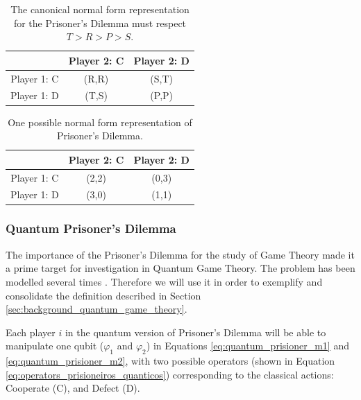 \begin{center}
\begin{table}
\begin{centering}
\begin{tabular}{ccc}
\hline 
 & Player 2: C & Player 2: D\tabularnewline
\hline 
Player 1: C & (R,R) & (S,T)\tabularnewline
Player 1: D & (T,S) & (P,P)\tabularnewline
\hline 
\end{tabular}
\par\end{centering}

\caption{The canonical normal form representation for the Prisoner's Dilemma must respect $T>R>P>S$.}
\label{tab:prisionersdillema_tab1}
\end{table}
\par\end{center}

\begin{center}
\begin{table}
\begin{centering}
\begin{tabular}{ccc}
\hline 
 & Player 2: C & Player 2: D\tabularnewline
\hline 
Player 1: C & (2,2) & (0,3)\tabularnewline
Player 1: D & (3,0) & (1,1)\tabularnewline
\hline 
\end{tabular}
\par\end{centering}

\caption{One possible normal form representation of Prisoner's Dilemma.}
\label{tab:prisionersdillema_tab2}
\end{table}
\par\end{center}



\subsubsection{Quantum Prisoner's Dilemma}
\label{subsubsec:quantum_prisioners_dillema}

The importance of the Prisoner's Dilemma for the study of Game Theory made it a prime target for investigation in Quantum Game Theory. The problem has been modelled several times \cite{Eisert2008}\cite{Fra2011a}. Therefore we will use it in order to exemplify and consolidate the definition described in Section \ref{sec:background_quantum_game_theory}\cite{Fra2011a}. 

Each player $i$ in the quantum version of Prisoner's Dilemma will be able to manipulate one qubit ($\varphi_{1}$ and $\varphi_{2}$) in Equations \ref{eq:quantum_prisioner_m1} and \ref{eq:quantum_prisioner_m2}, with two possible operators (shown in Equation \ref{eq:operators_prisioneiros_quanticos}) corresponding to the classical actions: Cooperate (C), and Defect (D). 

